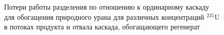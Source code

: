 

\begin{figure}[ht]
  \caption{Потери работы разделения по отношению к ординарному каскаду для обогащения природного урана для различных концентраций $^{235}$U в потоках продукта и отвала каскада, обогащающего регенерат}\label{Figure_13}
\end{figure}



